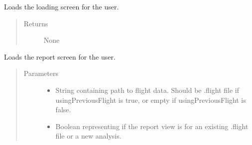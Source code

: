 \documentclass[letterpaper,10pt,english]{sphinxmanual}
\begin{document}
\begin{fulllineitems}
\begin{fulllineitems}
\begin{quote}
\begin{description}
\end{description}\end{quote}

\end{fulllineitems}


\begin{fulllineitems}
\label{\detokenize{index:src.Controllers.Program_Controller.Controller.show_loading_window}}
Loads the loading screen for the user.
\begin{quote}\begin{description}
\item[{Returns}] \leavevmode
None

\end{description}\end{quote}

\end{fulllineitems}


\begin{fulllineitems}
\label{\detokenize{index:src.Controllers.Program_Controller.Controller.show_report_window}}
Loads the report screen for the user.
\begin{quote}\begin{description}
\item[{Parameters}] \leavevmode\begin{itemize}
\item {} 
 \textendash{} String containing path to flight data. Should be .flight file if usingPreviousFlight is true, or empty if usingPreviousFlight is false.

\item {} 
 \textendash{} Boolean representing if the report view is for an existing .flight file or a new analysis.


\end{itemize}
\end{description}
\end{quote}
\end{fulllineitems}
\end{fulllineitems}
\end{document}
